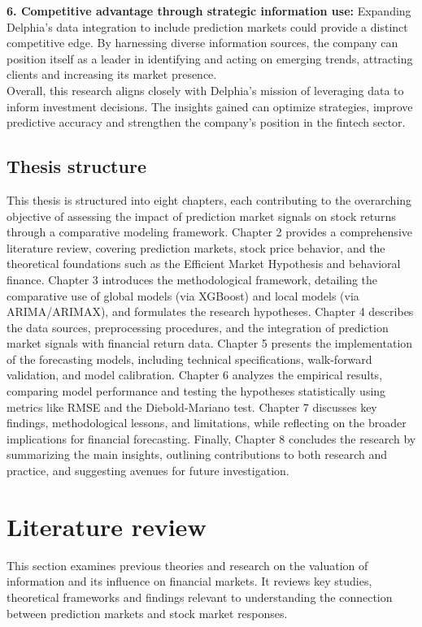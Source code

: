 \documentclass[12pt]{report}
\begin{document}
\textbf{6. Competitive advantage through strategic information use:}  
Expanding Delphia's data integration to include prediction markets could provide a distinct competitive edge. By harnessing diverse information sources, the company can position itself as a leader in identifying and acting on emerging trends, attracting clients and increasing its market presence.\\

Overall, this research aligns closely with Delphia's mission of leveraging data to inform investment decisions. The insights gained can optimize strategies, improve predictive accuracy and strengthen the company's position in the fintech sector.


\subsection{Thesis structure}

This thesis is structured into eight chapters, each contributing to the overarching objective of assessing the impact of prediction market signals on stock returns through a comparative modeling framework. Chapter 2 provides a comprehensive literature review, covering prediction markets, stock price behavior, and the theoretical foundations such as the Efficient Market Hypothesis and behavioral finance. Chapter 3 introduces the methodological framework, detailing the comparative use of global models (via XGBoost) and local models (via ARIMA/ARIMAX), and formulates the research hypotheses. Chapter 4 describes the data sources, preprocessing procedures, and the integration of prediction market signals with financial return data. Chapter 5 presents the implementation of the forecasting models, including technical specifications, walk-forward validation, and model calibration. Chapter 6 analyzes the empirical results, comparing model performance and testing the hypotheses statistically using metrics like RMSE and the Diebold-Mariano test. Chapter 7 discusses key findings, methodological lessons, and limitations, while reflecting on the broader implications for financial forecasting. Finally, Chapter 8 concludes the research by summarizing the main insights, outlining contributions to both research and practice, and suggesting avenues for future investigation.
\\


\newpage
\section{Literature review}
This section examines previous theories and research on the valuation of information and its influence on financial markets. It reviews key studies, theoretical frameworks and findings relevant to understanding the connection between prediction markets and stock market responses.
\end{document}

